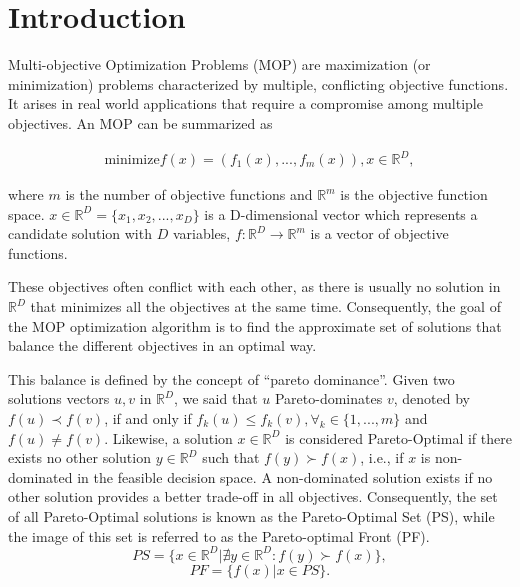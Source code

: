 \section{Introduction}

Multi-objective Optimization Problems (MOP) are maximization (or minimization) problems characterized by multiple, conflicting objective functions. It arises in real world applications that require a compromise among multiple objectives. An MOP can be summarized as



\vspace{-1em}
\begin{align}\label{min_problem}
\text{minimize} f(x) = (f_1(x), ..., f_{m}(x)), \text{$x \in \mathbb{R}^{D}$},
\end{align}

where $m$ is the number of objective functions and $\mathbb{R}^m$ is the objective function space. $x \in \mathbb{R}^{D} = \{x_1, x_2, ..., x_D\}$ is a D-dimensional vector which represents a candidate solution with ${D}$ variables, $f: \mathbb{R}^{D} \rightarrow \mathbb{R}^{m}$ is a vector of objective functions.

These objectives often conflict with each other, as there is usually no solution in $\mathbb{R}^{D}$ that minimizes all the objectives at the same time. Consequently, the goal of the MOP optimization algorithm is to find the approximate set of solutions that balance the different objectives in an optimal way.

This balance is defined by the concept of ``pareto dominance''. Given two solutions vectors $u, v$ in $\mathbb{R}^{D}$, we said that $u$  Pareto-dominates $v$, denoted by $f(u) \prec f(v)$, if and only if $f_k(u) \leq f_k(v), \forall_k \in \{1,..., m\}$ and $ f(u) \neq f(v)$. Likewise, a solution $x \in \mathbb{R}^{D}$ is considered Pareto-Optimal if there exists no other solution $y \in \mathbb{R}^{D}$ such that $f(y) \succ f(x)$, i.e., if $x$ is non-dominated in the feasible decision space. A non-dominated solution exists if no other solution provides a better trade-off in all objectives. Consequently, the set of all Pareto-Optimal solutions is known as the Pareto-Optimal Set (PS), while the image of this set is referred to as the Pareto-optimal Front (PF).%
\begin{equation}
PS = \{x \in \mathbb{R}^{D} | \nexists y \in \mathbb{R}^{D} : f(y) \succ f(x)  \},
\end{equation}
\begin{equation}
PF = \{f(x) | x \in PS \}.
\end{equation}

